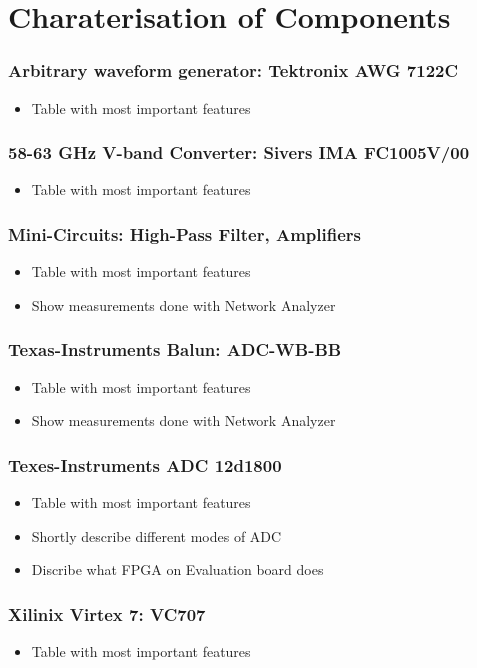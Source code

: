 \chapter{Charaterisation of Components}
\subsection{Arbitrary waveform generator: Tektronix AWG 7122C}
\begin{itemize}
\item Table with most important features
\end{itemize}

\subsection{58-63 GHz V-band Converter: Sivers IMA FC1005V/00}
\begin{itemize}
\item Table with most important features
\end{itemize}

\subsection{Mini-Circuits: High-Pass Filter, Amplifiers}
\begin{itemize}
\item Table with most important features
\item Show measurements done with Network Analyzer
\end{itemize}

\subsection{Texas-Instruments Balun: ADC-WB-BB}
\begin{itemize}
\item Table with most important features
\item Show measurements done with Network Analyzer
\end{itemize}

\subsection{Texes-Instruments ADC 12d1800}
\label{sec:comp_adc}

\begin{itemize}
\item Table with most important features
\item Shortly describe different modes of ADC
\item Discribe what FPGA on Evaluation board does
\end{itemize}

\subsection{Xilinix Virtex 7: VC707}
\begin{itemize}
\item Table with most important features
\end{itemize}
